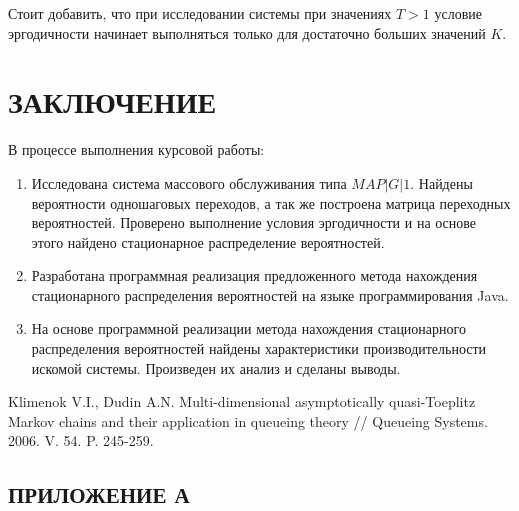 \documentclass[12pt, a4paper]{article}
\begin{document}
Стоит добавить, что при исследовании системы при значениях $T > 1$ условие эргодичности начинает выполняться только для достаточно больших значений $K$.

\pagebreak

	\section*{ЗАКЛЮЧЕНИЕ}


В процессе выполнения курсовой работы:

\begin{flushleft}
	\begin{enumerate}
		\item Исследована система массового обслуживания типа $MAP|G|1$. Найдены вероятности одношаговых переходов, а так же построена матрица переходных вероятностей. Проверено выполнение условия эргодичности и на основе этого найдено стационарное распределение вероятностей.
		\item Разработана программная реализация предложенного метода нахождения стационарного распределения вероятностей на языке программирования Java.
		\item На основе программной реализации метода нахождения стационарного распределения вероятностей найдены характеристики производительности искомой системы. Произведен их анализ и сделаны выводы. 
	\end{enumerate}
\end{flushleft}
\newpage
\begin{thebibliography}{20}
	Klimenok  V.I.,   Dudin A.N.  Multi-dimensional asymptotically quasi-Toeplitz
	Markov chains and their application in queueing theory // Queueing
	Systems. 2006. V. 54. P. 245-259.
\end{thebibliography}
\pagebreak
\begin{center}\section*{ПРИЛОЖЕНИЕ А}\end{center}
\end{document}
